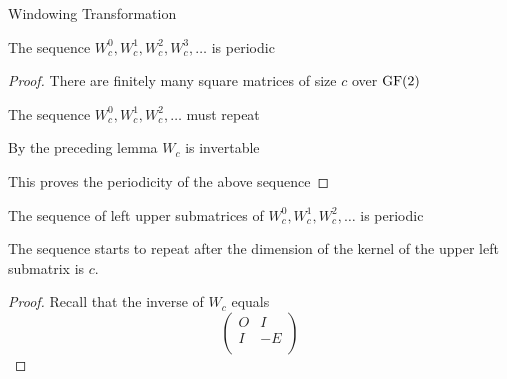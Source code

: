 \begin{frame}{Windowing Transformation}
	\begin{theorem}
		The sequence $W_{c}^{0}, W_{c}^{1}, W_{c}^{2}, W_{c}^{3}, \ldots$ is periodic
	\end{theorem}
	
	\pause
	\bigskip
	
	\begin{proof}
		There are finitely many square matrices of size $c$ over $\operatorname{GF}(2)$
		
		The sequence $W_{c}^{0}, W_{c}^{1}, W_{c}^{2},\ldots$ must repeat
		
		By the preceding lemma $W_{c}$ is invertable
		
		This proves the periodicity of the above sequence
	\end{proof}
	
	\pause
	\bigskip
	
	\begin{corollary}
		The sequence of left upper submatrices of 
		$W_{c}^{0}, W_{c}^{1}, W_{c}^{2},\ldots$ is periodic
	\end{corollary}
\end{frame}

\begin{frame}
	\begin{lemma}
		The sequence starts to repeat after the dimension of the kernel of the 
		upper left submatrix is $c$.
	\end{lemma}
	
	\pause
	\bigskip
	
	\begin{proof}
		Recall that the inverse of $W_{c}$ equals
		\[
			\left(
			\begin{array}{cc}
				O & I  \\
				I & -E \\
			\end{array}
			\right)
		\]
	\end{proof}
\end{frame}
